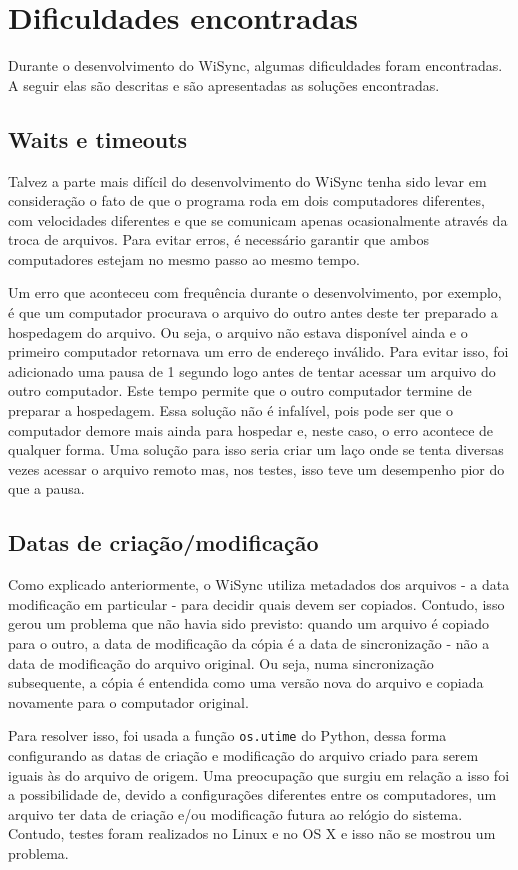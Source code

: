 \section{Dificuldades encontradas}
Durante o desenvolvimento do WiSync, algumas dificuldades foram encontradas.
A seguir elas são descritas e são apresentadas as soluções encontradas.

\subsection{Waits e timeouts}
Talvez a parte mais difícil do desenvolvimento do WiSync tenha sido levar em consideração o fato de que o programa roda em dois computadores diferentes, com velocidades diferentes e que se comunicam apenas ocasionalmente através da troca de arquivos.
Para evitar erros, é necessário garantir que ambos computadores estejam no mesmo passo ao mesmo tempo.

Um erro que aconteceu com frequência durante o desenvolvimento, por exemplo, é que um computador procurava o arquivo do outro antes deste ter preparado a hospedagem do arquivo.
Ou seja, o arquivo não estava disponível ainda e o primeiro computador retornava um erro de endereço inválido.
Para evitar isso, foi adicionado uma pausa de 1 segundo logo antes de tentar acessar um arquivo do outro computador.
Este tempo permite que o outro computador termine de preparar a hospedagem.
Essa solução não é infalível, pois pode ser que o computador demore mais ainda para hospedar e, neste caso, o erro acontece de qualquer forma.
Uma solução para isso seria criar um laço onde se tenta diversas vezes acessar o arquivo remoto mas, nos testes, isso teve um desempenho pior do que a pausa.

\subsection{Datas de criação/modificação}
Como explicado anteriormente, o WiSync utiliza metadados dos arquivos \-- a data modificação em particular \-- para decidir quais devem ser copiados.
Contudo, isso gerou um problema que não havia sido previsto: quando um arquivo é copiado para o outro, a data de modificação da cópia é a data de sincronização \-- não a data de modificação do arquivo original.
Ou seja, numa sincronização subsequente, a cópia é entendida como uma versão nova do arquivo e copiada novamente para o computador original.

Para resolver isso, foi usada a função \texttt{os.utime} do Python, dessa forma configurando as datas de criação e modificação do arquivo criado para serem iguais às do arquivo de origem. Uma preocupação que surgiu em relação a isso foi a possibilidade de, devido a configurações diferentes entre os computadores, um arquivo ter data de criação e/ou modificação futura ao relógio do sistema.
Contudo, testes foram realizados no Linux e no OS X e isso não se mostrou um problema.

